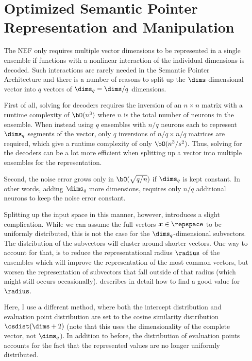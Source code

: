 \section{Optimized Semantic Pointer Representation and Manipulation}
The NEF only requires multiple vector dimensions to be represented in a single ensemble if functions with a nonlinear interaction of the individual dimensions is decoded.
Such interactions are rarely needed in the Semantic Pointer Architecture and there is a number of reasons to split up the $\dims$-dimensional vector into $q$ vectors of $\dims_q = \dims / q$ dimensions.

First of all, solving for decoders requires the inversion of an $n \times n$ matrix with a runtime complexity of $\bO(n^3)$ where $n$ is the total number of neurons in the ensemble.
When instead using $q$ ensembles with $n/q$ neurons each to represent $\dims_q$ segments of the vector, only $q$ inversions of $n/q \times n/q$ matrices are required, which give a runtime complexity of only $\bO(n^3/s^2)$.
Thus, solving for the decoders can be a lot more efficient when splitting up a vector into multiple ensembles for the representation.

Second, the noise error grows only in $\bO(\sqrt{q/n})$ if $\dims_q$ is kept constant.
In other words, adding $\dims_q$ more dimensions, requires only $n/q$ additional neurons to keep the noise error constant.

Splitting up the input space in this manner, however, introduces a slight complication.
While we can assume the full vectors $\vc x \in \repspace$ to be uniformly distributed, this is not the case for the $\dims_q$-dimensional subvectors.
The distribution of the subvectors will cluster around shorter vectors.
One way to account for that, is to reduce the representational radius $\radius$ of the ensembles which will improve the representation of the most common vectors, but worsen the representation of subvectors that fall outside of that radius (which might still occurs occasionally).
\Textcite{gosmann216} describes in detail how to find a good value for $\radius$.

Here, I use a different method, where both the intercept distribution and evaluation point distribution are set to the cosine similarity distribution $\csdist(\dims + 2)$ (note that this uses the dimensionality of the complete vector, not $\dims_q$).
In addition to before, the distribution of evaluation points accounts for the fact that the represented values are no longer uniformly distributed.

